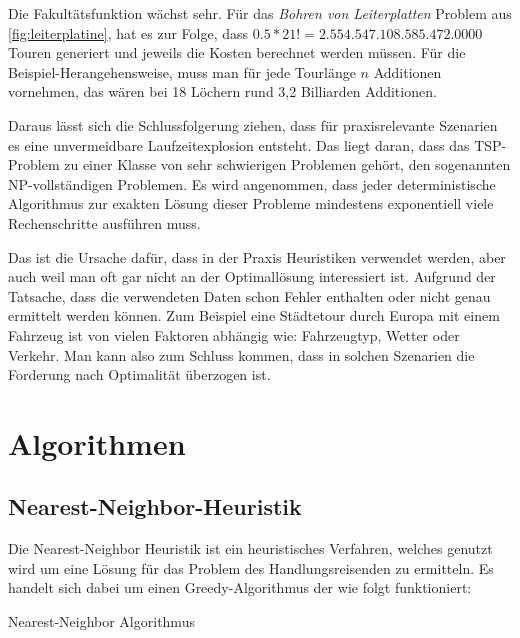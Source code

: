 \documentclass{article}
\begin{document}
Die Fakultätsfunktion wächst sehr. Für das \textit{Bohren von Leiterplatten} Problem aus \autoref{fig:leiterplatine}, hat es zur Folge, dass $0.5 * 21! = 2.554.547.108.585.472.0000$ Touren generiert und jeweils die Kosten berechnet werden müssen. Für die Beispiel-Herangehensweise, muss man für jede Tourlänge $n$ Additionen vornehmen, das wären bei 18 Löchern rund 3,2 Billiarden Additionen.
\par Daraus lässt sich die Schlussfolgerung ziehen, dass für praxisrelevante Szenarien es eine unvermeidbare Laufzeitexplosion entsteht. Das liegt daran, dass das TSP-Problem zu einer Klasse von sehr schwierigen Problemen gehört, den sogenannten NP-vollständigen Problemen. Es wird angenommen, dass jeder deterministische Algorithmus zur exakten Lösung dieser Probleme mindestens exponentiell viele Rechenschritte ausführen muss.
\par Das ist die Ursache dafür, dass in der Praxis Heuristiken verwendet werden, aber auch weil man oft gar nicht an der Optimallösung interessiert ist. Aufgrund der Tatsache, dass die verwendeten Daten schon Fehler enthalten oder nicht genau ermittelt werden können. Zum Beispiel eine Städtetour durch Europa mit einem Fahrzeug ist von vielen Faktoren abhängig wie: Fahrzeugtyp, Wetter oder Verkehr. Man kann also zum Schluss kommen, dass in solchen Szenarien die Forderung nach Optimalität überzogen ist.


%
%
%
\newpage
\section{Algorithmen}

\subsection{Nearest-Neighbor-Heuristik}

Die Nearest-Neighbor Heuristik ist ein heuristisches Verfahren, welches genutzt wird um eine Lösung für das Problem des Handlungsreisenden zu ermitteln. Es handelt sich dabei um einen Greedy-Algorithmus der wie folgt funktioniert:

\begin{algorithm}
\caption{Nearest-Neighbor Algorithmus}
\end{algorithm}
\end{document}

